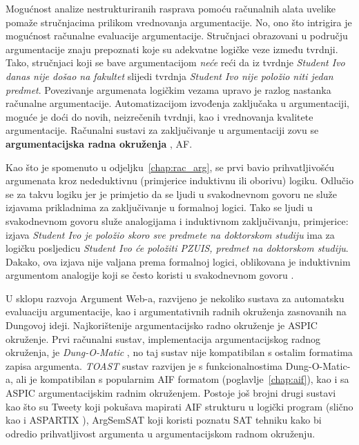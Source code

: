 Mogućnost analize nestrukturiranih rasprava pomoću
računalnih alata uvelike pomaže stručnjacima prilikom 
vrednovanja argumentacije. No, ono što intrigira je 
mogućnost računalne evaluacije argumentacije. 
Stručnjaci obrazovani u području argumentacije znaju prepoznati
koje su adekvatne logičke veze između tvrdnji. Tako,  
stručnjaci koji se bave argumentacijom \emph{neće} reći da iz tvrdnje
\emph{Student Ivo danas nije došao na fakultet} slijedi
tvrdnja \emph{Student Ivo nije položio niti jedan predmet}.
Povezivanje argumenata logičkim vezama upravo je
razlog nastanka računalne argumentacije. 
Automatizacijom izvođenja zaključaka u argumentaciji,
moguće je doći do novih, neizrečenih tvrdnji, 
kao i vrednovanja kvalitete argumentacije. 
Računalni sustavi za zaključivanje u argumentaciji zovu se 
\textbf{argumentacijska radna okruženja} , \@{AF}.

Kao što je spomenuto u odjeljku~\ref{chap:rac_arg},
\cite{dung1995acceptability} se prvi bavio 
prihvatljivošću argumenata  
kroz nededuktivnu (primjerice induktivnu ili oborivu) logiku.
Odlučio se za takvu logiku jer je primjetio da se ljudi u svakodnevnom 
govoru ne služe izjavama prikladnima za zaključivanje u formalnoj logici. 
Tako se ljudi u svakodnevnom govoru služe analogijama i induktivnom zaključivanju, 
primjerice: izjava \emph{Student Ivo je položio skoro sve predmete na doktorskom studiju} 
ima za logičku posljedicu \emph{Student Ivo će položiti PZUIS, predmet na doktorskom studiju}. 
Dakako, ova izjava nije valjana prema formalnoj logici, oblikovana je
induktivnim argumentom analogije koji se često koristi u svakodnevnom govoru 
\citep{juthe2005argument}.

U sklopu razvoja Argument Web-a, razvijeno je nekoliko sustava za
automatsku evaluaciju argumentacije, kao i argumentativnih radnih okruženja
zasnovanih na Dungovoj ideji. Najkorištenije argumentacijsko radno okruženje
je ASPIC okruženje. 
Prvi računalni sustav, implementacija argumentacijskog radnog okruženja, 
je \emph{Dung-O-Matic} \citep{snaith2010pipelining},
no taj sustav nije kompatibilan s ostalim formatima zapisa argumenta. 
\emph{TOAST} sustav razvijen je s funkcionalnostima Dung-O-Matic-a, ali 
je kompatibilan s popularnim AIF formatom (poglavlje~\ref{chap:aif}), kao i sa 
ASPIC argumentacijskim radnim okruženjem. 
Postoje još brojni drugi sustavi kao što su Tweety \citep{thimm2014tweety} koji
pokušava mapirati AIF strukturu u logički program 
(slično kao i ASPARTIX \citep{egly2008aspartix}),
ArgSemSAT \citep{cerutti2014argsemsat}
koji koristi poznatu SAT \citep{moskewicz2001chaff}
 tehniku kako bi odredio prihvatljivost argumenta
u argumentacijskom radnom okruženju.

